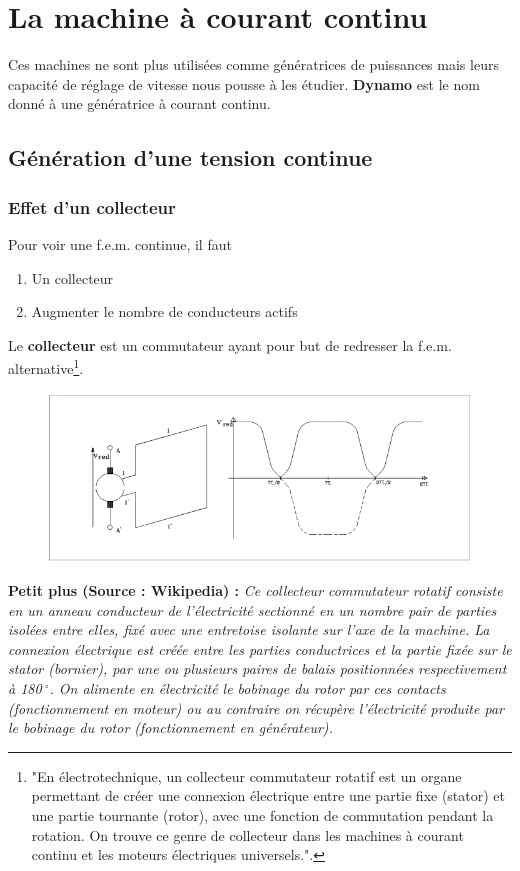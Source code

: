\chapter{La machine à courant continu}
Ces machines ne sont plus utilisées comme génératrices de puissances 
mais leurs capacité de réglage de vitesse nous pousse à les étudier. 
\textbf{Dynamo} est le nom donné à une génératrice à courant continu.

\section{Génération d'une tension continue}
	\subsection{Effet d'un collecteur}
	Pour voir une f.e.m. continue, il faut 
	\begin{enumerate}
	\item Un collecteur
	\item Augmenter le nombre de conducteurs actifs
	\end{enumerate}
	Le \textbf{collecteur} est un commutateur ayant pour but de 
	redresser la f.e.m. alternative\footnote{"En électrotechnique, 
	un collecteur commutateur rotatif est un organe permettant de 
	créer 	une connexion électrique entre une partie fixe (stator) 
	et une 	partie tournante (rotor), avec une fonction de 
	commutation pendant 	la rotation. On trouve ce genre de 
	collecteur dans les machines à courant continu et les moteurs 
	électriques universels.".}.\\
	\begin{figure}
	\vspace{-5mm}
	\includegraphics[scale=0.34]{ch4/image1.png}
	\end{figure}
	\textbf{Petit plus (Source : Wikipedia) :} \textit{Ce collecteur 
	commutateur rotatif consiste en un anneau conducteur de l'électricité  
	sectionné en un nombre pair de parties 
	isolées entre elles, fixé avec une entretoise isolante sur l'axe de 
	la machine. La connexion électrique est créée entre les parties 
	conductrices et la partie fixée sur le stator (bornier), par une ou 
	plusieurs paires de balais positionnées respectivement à 180$\ ^\circ$. 
	On alimente en électricité le bobinage du rotor par ces contacts 
	(fonctionnement en moteur) ou au contraire on 	récupère l'électricité 
	produite par le bobinage du rotor (fonctionnement en générateur).}\ \\
	

